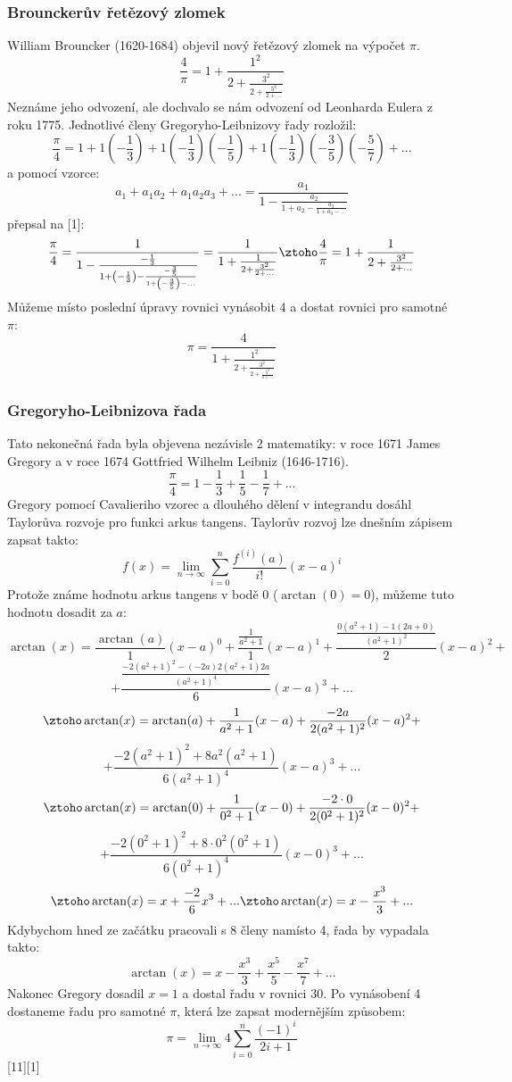 \documentclass[rocnikovka]{gzwroc} %
\begin{document}
\subsubsection{Brounckerův řetězový zlomek}
William Brouncker (1620-1684) objevil nový řetězový zlomek na výpočet $\pi$.
\begin{equation}
\frac{4}{\pi}=1+\frac{1^2}{2+\frac{3^2}{2+\frac{5^2}{2+...}}}
\end{equation}
Neznáme jeho odvození, ale dochvalo se nám odvození od Leonharda Eulera z roku 1775. Jednotlivé členy Gregoryho-Leibnizovy řady rozložil:
$$
\frac{\pi}{4}=1+1\left(-\frac{1}{3}\right)+1\left(-\frac{1}{3}\right)\left(-\frac{1}{5}\right)+1\left(-\frac{1}{3}\right)\left(-\frac{3}{5}\right)\left(-\frac{5}{7}\right)+...
$$
a pomocí vzorce:
$$
a_1+a_1a_2+a_1a_2a_3+...=\frac{a_1}{1-\frac{a_2}{1+a_2-\frac{a_3}{1+a_3-...}}}
$$
přepsal na [1]:
$$
\frac{\pi}{4}=\frac{1}{1-\frac{-\frac{1}{3}}{1+\left(-\frac{1}{3}\right)-\frac{-\frac{3}{5}}{1+\left(-\frac{3}{5}\right)-...}}}=\frac{1}{1+\frac{1}{2+\frac{3^2}{2+...}}} \ztoho \frac{4}{\pi}=1+\frac{1}{2+\frac{3^2}{2+...}}
$$
Můžeme místo poslední úpravy rovnici vynásobit 4 a dostat rovnici pro samotné $\pi$:
\begin{equation}
\pi=\frac{4}{1+\frac{1^2}{2+\frac{3^2}{2+\frac{5^2}{2+...}}}}
\end{equation}
\subsubsection{Gregoryho-Leibnizova řada}
Tato nekonečná řada byla objevena nezávisle 2 matematiky: v roce 1671 James Gregory a v roce 1674 Gottfried Wilhelm Leibniz (1646-1716).
\begin{equation}
\frac{\pi}{4}=1-\frac{1}{3}+\frac{1}{5}-\frac{1}{7}+...
\end{equation}
Gregory pomocí Cavalieriho vzorec a dlouhého dělení v integrandu dosáhl Taylorůva rozvoje pro funkci arkus tangens. Taylorův rozvoj lze dnešním zápisem zapsat takto:
$$
f(x)=\lim_{n\to\infty} \sum_{i=0}^{n} \frac{f^{(i)}(a)}{i!}(x-a)^i
$$
Protože známe hodnotu arkus tangens v bodě 0 ($\arctan(0)=0$), můžeme tuto hodnotu dosadit za $a$:
$$
\arctan(x)=\frac{\arctan(a)}{1}(x-a)^0+\frac{\frac{1}{a^2+1}}{1}(x-a)^1+\frac{\frac{0(a^2+1)-1(2a+0)}{(a^2+1)^2}}{2}(x-a)^2+
$$
$$
+\frac{\frac{-2(a^2+1)^2-(-2a)2(a^2+1)2a}{(a^2+1)^4}}{6}(x-a)^3+...
$$
$$
\ztoho \arctan(x)=\arctan(a)+\frac{1}{a^2+1}(x-a)+\frac{-2a}{2(a^2+1)^2}(x-a)^2+
$$
$$
+\frac{-2(a^2+1)^2+8a^2(a^2+1)}{6(a^2+1)^4}(x-a)^3+...
$$
$$
\ztoho \arctan(x)=\arctan(0)+\frac{1}{0^2+1}(x-0)+\frac{-2\cdot0}{2(0^2+1)^2}(x-0)^2+
$$
$$
+\frac{-2(0^2+1)^2+8\cdot0^2(0^2+1)}{6(0^2+1)^4}(x-0)^3+...
$$
$$
\ztoho \arctan(x)=x+\frac{-2}{6}x^3+...\ztoho \arctan(x)=x-\frac{x^3}{3}+...
$$
Kdybychom hned ze začátku pracovali s 8 členy namísto 4, řada by vypadala takto:
$$
\arctan(x)=x-\frac{x^3}{3}+\frac{x^5}{5}-\frac{x^7}{7}+...
$$
Nakonec Gregory dosadil $x=1$ a dostal řadu v rovnici 30. Po vynásobení 4 dostaneme řadu pro samotné $\pi$, která lze zapsat modernějším způsobem:
\begin{equation}
\pi=\lim_{n\to\infty} 4\sum_{i=0}^{n} \frac{(-1)^i}{2i+1}
\end{equation}
[11][1]
\end{document}
